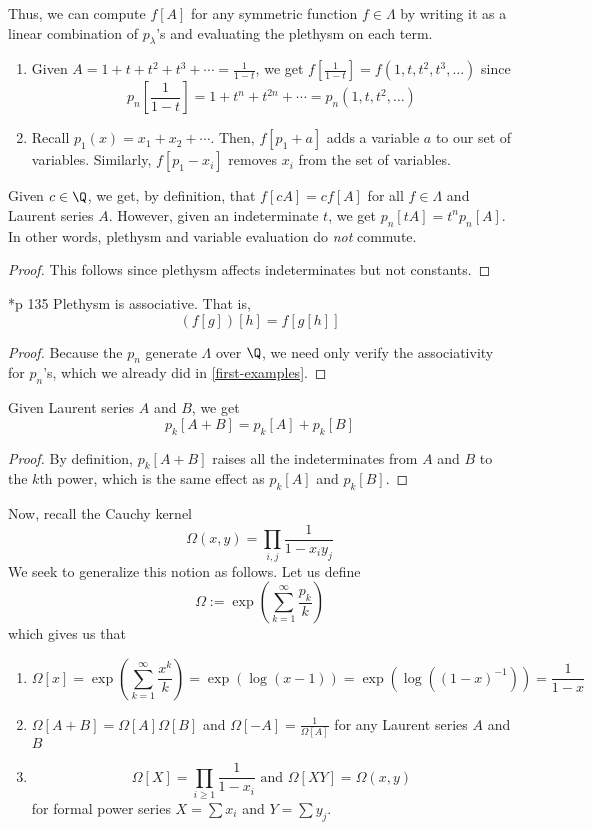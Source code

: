 \documentclass[11pt,leqno,oneside]{amsart}
\numberwithin{thm}{section}
\newcommand{\sym}{\Lambda}
\begin{document}
Thus, we can compute \(f[A]\) for any symmetric function \(f \in
\sym\) by writing it as a linear combination of \(p_\lambda\)'s and
evaluating the plethysm on each term.
\begin{example}
  \begin{enumerate}
  \item Given \(A = 1+t+t^2+t^3+\cdots = \frac{1}{1-t}\), we get
  \(f[\frac{1}{1-t}] = f(1,t,t^2,t^3,\ldots)\) since \[
    p_n\left[\frac{1}{1-t}\right] = 1+t^n+t^{2n}+\cdots =
    p_n(1,t,t^2,\ldots) 
  \]
  \item Recall \(p_1(x) = x_1 + x_2 + \cdots\). Then, \(f[p_1+a]\) adds a
    variable \(a\) to our set of variables. Similarly, \(f[p_1-x_i]\)
    removes \(x_i\) from the set of variables.
  \end{enumerate}
\end{example}
\begin{prop}
  Given \(c \in \Q\), we get, by definition, that \(f[cA] = cf[A]\)
  for all \(f \in \sym\) and Laurent series \(A\). However, given an
  indeterminate \(t\), we get \(p_n[tA] = t^n p_n[A]\). In other
  words, plethysm and variable evaluation do \emph{not} commute.
\end{prop}
\begin{proof}
  This follows since plethysm affects indeterminates but not
  constants. 
\end{proof}
\begin{prop}
  \cite{macdonald}*{p 135} Plethysm is associative. That is, \[
   (f[g])[h] = f[g[h]]
  \]
\end{prop}
\begin{proof}
  Because the \(p_n\) generate \(\sym\) over \(\Q\), we need only
  verify the associativity for \(p_n\)'s, which we already did in
  \ref{first-examples}. 
\end{proof}
\begin{lem}
  Given Laurent series \(A\) and \(B\), we get \[
    p_k[A+B] = p_k[A]+p_k[B]
  \]
\end{lem}
\begin{proof}
  By definition, \(p_k[A+B]\) raises all the indeterminates from \(A\)
  and \(B\) to the \(k\)th power, which is the same effect as
  \(p_k[A]\) and \(p_k[B]\).
\end{proof}
Now, recall the Cauchy kernel \[
  \Omega(x,y) = \prod_{i,j} \frac{1}{1-x_i y_j}
\]
We seek to generalize this notion as follows. Let us define \[
  \Omega := \exp\left( \sum_{k=1}^\infty \frac{p_k}{k} \right) 
\]
which gives us that
\begin{prop}
  \begin{enumerate}
  \item \[
  \Omega[x] = \exp\left( \sum_{k=1}^\infty \frac{x^k}{k} \right) =
  \exp\left( \log(x-1) \right) = \exp\left( \log((1-x)^{-1}) \right) = \frac{1}{1-x}
\]
  \item \(\Omega[A+B] = \Omega[A]\Omega[B]\) and \(\Omega[-A] =
    \frac{1}{\Omega[A]}\) for any Laurent series \(A\) and \(B\)
  \item \[
  \Omega[X] = \prod_{i \geq 1} \frac{1}{1-x_i} \text{ and } \Omega[XY]
  = \Omega(x,y)
\]
for formal power series \(X = \sum x_i\) and \(Y = \sum y_j\). 
  \end{enumerate}
\end{prop}
\end{document}
